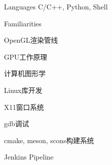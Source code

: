 
\begin{cvskills}
  \cvskill
    {Languages} %
    {C/C++, Python, Shell} %
\end{cvskills}

\begin{cventries}
  \cventry
    {} %
    {Familiarities} %
    {\hspace{1cm}} %
    {} %
    {
      \begin{cvitems} %
        \item {OpenGL渲染管线}
        \item {GPU工作原理}
        \item {计算机图形学}
        \item {Linux库开发}
        \item {X11窗口系统}
        \item {gdb调试}
        \item {cmake, meson, scons构建系统}
        \item {Jenkins Pipeline}
      \end{cvitems}
    }
\end{cventries}
